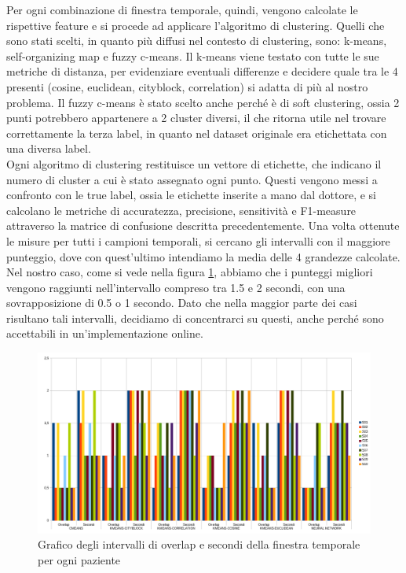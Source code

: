 Per ogni combinazione di finestra temporale, quindi, vengono calcolate le rispettive feature e si procede ad applicare l'algoritmo di clustering. Quelli che sono stati scelti, in quanto più diffusi nel contesto di clustering, sono: k-means, self-organizing map e fuzzy c-means. Il k-means viene testato con tutte le sue metriche di distanza, per evidenziare eventuali differenze e decidere quale tra le 4 presenti (cosine, euclidean, cityblock, correlation) si adatta di più al nostro problema. Il fuzzy c-means è stato scelto anche perché è di soft clustering, ossia 2 punti potrebbero appartenere a 2 cluster diversi, il che ritorna utile nel trovare correttamente la terza label, in quanto nel dataset originale era etichettata con una diversa label.\\
Ogni algoritmo di clustering restituisce un vettore di etichette, che indicano il numero di cluster a cui è stato assegnato ogni punto. Questi vengono messi a confronto con le true label, ossia le etichette inserite a mano dal dottore, e si calcolano le metriche di accuratezza, precisione, sensitività e F1-measure attraverso la matrice di confusione descritta precedentemente. Una volta ottenute le misure per tutti i campioni temporali, si cercano gli intervalli con il maggiore punteggio, dove con quest'ultimo intendiamo la media delle 4 grandezze calcolate. Nel nostro caso, come si vede nella figura \ref{SecondiOverlap}, abbiamo che i punteggi migliori vengono raggiunti nell'intervallo compreso tra 1.5 e 2 secondi, con una sovrapposizione di 0.5 o 1 secondo. Dato che nella maggior parte dei casi risultano tali intervalli, decidiamo di concentrarci su questi, anche perché sono accettabili in un'implementazione online.\\
\begin{figure}[]
	\centering
	\includegraphics[scale=0.35]{images/secondi_overlap.png}
	\caption{Grafico degli intervalli di overlap e secondi della finestra temporale per ogni paziente}
	\label{SecondiOverlap}
\end{figure}
